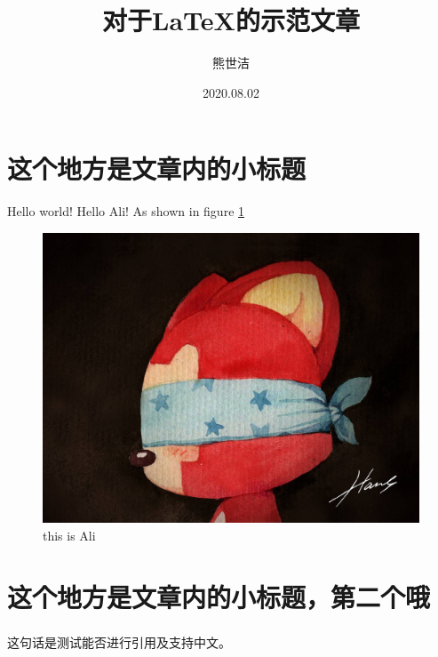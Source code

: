 \documentclass[fontset=windows]{article}
\title{\heiti\zihao{2}对于LaTeX的示范文章}  %
\author{\songti 熊世洁}  %
\date{2020.08.02}  %
\newcommand{\upcite}[1]{\textsuperscript{\cite{#1}}}
\begin{document}
	\maketitle
	\thispagestyle{empty}

\begin{abstract}
	\lipsum[2]  %
\end{abstract}

\tableofcontents

\section{这个地方是文章内的小标题}
Hello world! Hello Ali! As shown in figure \ref{1}
\begin{figure}[htbp]
	\centering
	\includegraphics[scale=0.1]{Ali.jpg}
	\caption{this is Ali}
	\label{1}
\end{figure}


\section{这个地方是文章内的小标题，第二个哦}


这句话是测试能否进行引用及支持中文\upcite{1}。

\end{document}
